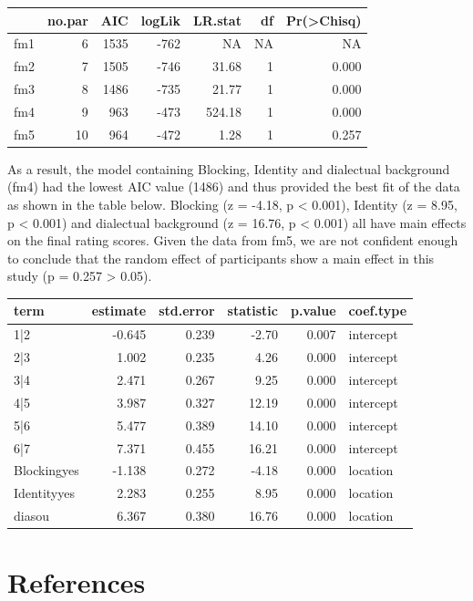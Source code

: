 \documentclass[
  english,
  man,floatsintext]{apa6}
\begin{document}
\begin{tabular}{l|r|r|r|r|r|r}
\hline
  & no.par & AIC & logLik & LR.stat & df & Pr(>Chisq)\\
\hline
fm1 & 6 & 1535 & -762 & NA & NA & NA\\
\hline
fm2 & 7 & 1505 & -746 & 31.68 & 1 & 0.000\\
\hline
fm3 & 8 & 1486 & -735 & 21.77 & 1 & 0.000\\
\hline
fm4 & 9 & 963 & -473 & 524.18 & 1 & 0.000\\
\hline
fm5 & 10 & 964 & -472 & 1.28 & 1 & 0.257\\
\hline
\end{tabular}

As a result, the model containing Blocking, Identity and dialectual background (fm4) had the lowest AIC value (1486) and thus provided the best fit of the data as shown in the table below. Blocking (z = -4.18, p \textless{} 0.001), Identity (z = 8.95, p \textless{} 0.001) and dialectual background (z = 16.76, p \textless{} 0.001) all have main effects on the final rating scores. Given the data from fm5, we are not confident enough to conclude that the random effect of participants show a main effect in this study (p = 0.257 \textgreater{} 0.05).

\begin{tabular}{l|r|r|r|r|l}
\hline
term & estimate & std.error & statistic & p.value & coef.type\\
\hline
1|2 & -0.645 & 0.239 & -2.70 & 0.007 & intercept\\
\hline
2|3 & 1.002 & 0.235 & 4.26 & 0.000 & intercept\\
\hline
3|4 & 2.471 & 0.267 & 9.25 & 0.000 & intercept\\
\hline
4|5 & 3.987 & 0.327 & 12.19 & 0.000 & intercept\\
\hline
5|6 & 5.477 & 0.389 & 14.10 & 0.000 & intercept\\
\hline
6|7 & 7.371 & 0.455 & 16.21 & 0.000 & intercept\\
\hline
Blockingyes & -1.138 & 0.272 & -4.18 & 0.000 & location\\
\hline
Identityyes & 2.283 & 0.255 & 8.95 & 0.000 & location\\
\hline
diasou & 6.367 & 0.380 & 16.76 & 0.000 & location\\
\hline
\end{tabular}

\newpage

\hypertarget{references}{%
\section{References}\label{references}}
\end{document}
